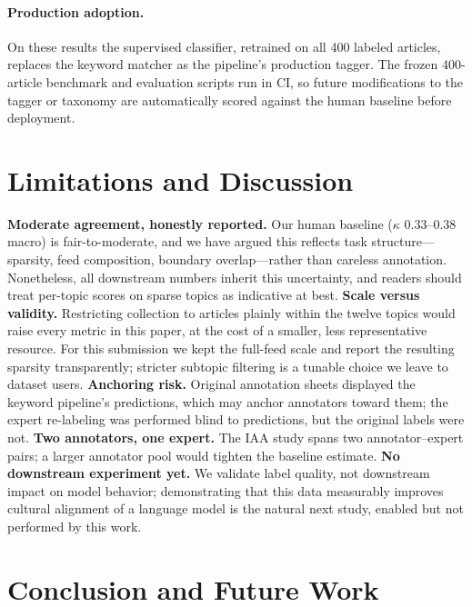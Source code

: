 \documentclass[letterpaper,twocolumn,10pt]{article}
\begin{document}
\paragraph{Production adoption.}
On these results the supervised classifier, retrained on all 400 labeled
articles, replaces the keyword matcher as the pipeline's production
tagger. The frozen 400-article benchmark and evaluation scripts run in
CI, so future modifications to the tagger or taxonomy are automatically
scored against the human baseline before deployment.

\section{Limitations and Discussion}
\label{sec:limitations}

\textbf{Moderate agreement, honestly reported.} Our human baseline
($\kappa$ 0.33--0.38 macro) is fair-to-moderate, and we have argued this
reflects task structure---sparsity, feed composition, boundary
overlap---rather than careless annotation. Nonetheless, all downstream
numbers inherit this uncertainty, and readers should treat per-topic
scores on sparse topics as indicative at best.
\textbf{Scale versus validity.} Restricting collection to articles
plainly within the twelve topics would raise every metric in this paper,
at the cost of a smaller, less representative resource. For this
submission we kept the full-feed scale and report the resulting
sparsity transparently; stricter subtopic filtering is a tunable choice
we leave to dataset users.
\textbf{Anchoring risk.} Original annotation sheets displayed the
keyword pipeline's predictions, which may anchor annotators toward
them; the expert re-labeling was performed blind to predictions, but
the original labels were not.
\textbf{Two annotators, one expert.} The IAA study spans two
annotator--expert pairs; a larger annotator pool would tighten the
baseline estimate.
\textbf{No downstream experiment yet.} We validate label quality, not
downstream impact on model behavior; demonstrating that this data
measurably improves cultural alignment of a language model is the
natural next study, enabled but not performed by this work.

\section{Conclusion and Future Work}
\end{document}
